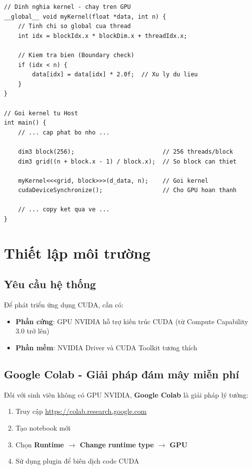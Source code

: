 \begin{lstlisting}[caption={Cấu trúc cơ bản của một CUDA kernel}, label={lst:kernel_basic}]
// Dinh nghia kernel - chay tren GPU
__global__ void myKernel(float *data, int n) {
    // Tinh chi so global cua thread
    int idx = blockIdx.x * blockDim.x + threadIdx.x;
    
    // Kiem tra bien (Boundary check)
    if (idx < n) {
        data[idx] = data[idx] * 2.0f;  // Xu ly du lieu
    }
}

// Goi kernel tu Host
int main() {
    // ... cap phat bo nho ...
    
    dim3 block(256);                         // 256 threads/block
    dim3 grid((n + block.x - 1) / block.x);  // So block can thiet
    
    myKernel<<<grid, block>>>(d_data, n);    // Goi kernel
    cudaDeviceSynchronize();                 // Cho GPU hoan thanh
    
    // ... copy ket qua ve ...
}
\end{lstlisting}

\section{Thiết lập môi trường}

\subsection{Yêu cầu hệ thống}

Để phát triển ứng dụng CUDA, cần có:
\begin{itemize}
    \item \textbf{Phần cứng}: GPU NVIDIA hỗ trợ kiến trúc CUDA (từ Compute Capability 3.0 trở lên)
    \item \textbf{Phần mềm}: NVIDIA Driver và CUDA Toolkit tương thích
\end{itemize}

\subsection{Google Colab - Giải pháp đám mây miễn phí}

Đối với sinh viên không có GPU NVIDIA, \textbf{Google Colab} là giải pháp lý tưởng:

\begin{enumerate}
    \item Truy cập \url{https://colab.research.google.com}
    \item Tạo notebook mới
    \item Chọn \textbf{Runtime $\rightarrow$ Change runtime type $\rightarrow$ GPU}
    \item Sử dụng plugin  để biên dịch code CUDA
\end{enumerate}

